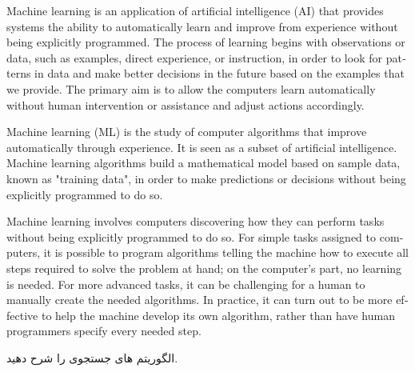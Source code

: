 \documentclass[12pt]{article}
\begin{document}
\begin{latin}
\begin{tcolorbox}
Machine learning is an application of artificial intelligence (AI) that provides systems the ability to automatically learn and improve from experience without being explicitly programmed.
\newline
The process of learning begins with observations or data, such as examples, direct experience, or instruction, in order to look for patterns in data and make better decisions in the future based on the examples that we provide. The primary aim is to allow the computers learn automatically without human intervention or assistance and adjust actions accordingly.
\end{tcolorbox}
\end{latin}



\begin{latin}
\begin{tcolorbox}
Machine learning (ML) is the study of computer algorithms that improve automatically through experience. It is seen as a subset of artificial intelligence. Machine learning algorithms build a mathematical model based on sample data, known as "training data", in order to make predictions or decisions without being explicitly programmed to do so.
\end{tcolorbox}
\end{latin}



\begin{latin}
\begin{tcolorbox}
Machine learning involves computers discovering how they can perform tasks without being explicitly programmed to do so. For simple tasks assigned to computers, it is possible to program algorithms telling the machine how to execute all steps required to solve the problem at hand; on the computer's part, no learning is needed. For more advanced tasks, it can be challenging for a human to manually create the needed algorithms. In practice, it can turn out to be more effective to help the machine develop its own algorithm, rather than have human programmers specify every needed step.
\end{tcolorbox}
\end{latin}





\newpage
\vspace{20pt}
\noindent
الگوریتم های جستجوی
 را شرح دهید.
\end{document}
